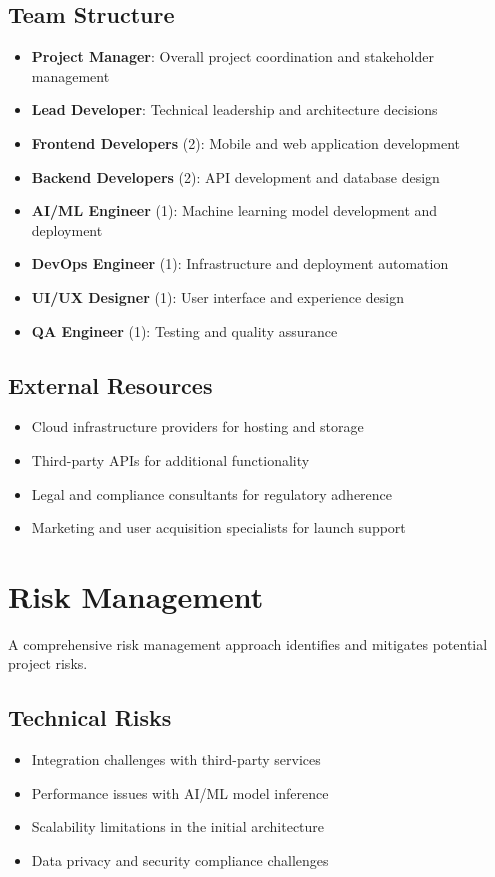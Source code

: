 \documentclass[12pt,a4paper]{report}
\begin{document}
\subsection{Team Structure}
\begin{itemize}[leftmargin=2em]
  \item \textbf{Project Manager}: Overall project coordination and stakeholder management
  \item \textbf{Lead Developer}: Technical leadership and architecture decisions
  \item \textbf{Frontend Developers} (2): Mobile and web application development
  \item \textbf{Backend Developers} (2): API development and database design
  \item \textbf{AI/ML Engineer} (1): Machine learning model development and deployment
  \item \textbf{DevOps Engineer} (1): Infrastructure and deployment automation
  \item \textbf{UI/UX Designer} (1): User interface and experience design
  \item \textbf{QA Engineer} (1): Testing and quality assurance
\end{itemize}

\subsection{External Resources}
\begin{itemize}[leftmargin=2em]
  \item Cloud infrastructure providers for hosting and storage
  \item Third-party APIs for additional functionality
  \item Legal and compliance consultants for regulatory adherence
  \item Marketing and user acquisition specialists for launch support
\end{itemize}

\section{Risk Management}
A comprehensive risk management approach identifies and mitigates potential project risks.

\subsection{Technical Risks}
\begin{itemize}[leftmargin=2em]
  \item Integration challenges with third-party services
  \item Performance issues with AI/ML model inference
  \item Scalability limitations in the initial architecture
  \item Data privacy and security compliance challenges
\end{itemize}
\end{document}
